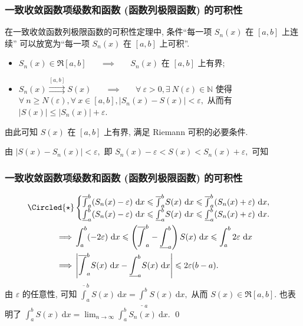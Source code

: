 
\begin{frame}
\frametitle{一致收敛函数项级数和函数 (函数列极限函数) 的可积性}

\begin{remark}
在一致收敛函数列极限函数的可积性定理中, 条件``每一项 $S_n(x)$ 在 $[a, b]$ 上连续'' 可以放宽为``每一项 $S_n(x)$ 在 $[a, b]$ 上可积''.
\end{remark}

\startproof[bg=yellow, fg=red]
\begin{itemize}
\item $S_n(x) \in \mathfrak{R}[a, b]$ ~~ $\implies$ ~~ $S_n(x)$ 在 $[a, b]$ 上有界;
\item $S_n(x) \stackrel{[a, b]}{\rightrightarrows} S(x)$ ~~ $\implies$ ~~ $\forall ~ \varepsilon > 0, \exists ~ N(\varepsilon) \in \mathbb{N}$ 使得 $\forall ~ n \geqslant N(\varepsilon), \forall ~ x \in [a, b], |S_n(x) - S(x)| < \varepsilon,$ 从而有 $|S(x)| \leqslant |S_n(x)| + \varepsilon.$
\end{itemize}
\vspace{0.5em}
由此可知 $S(x)$ 在 $[a, b]$ 上有界, 满足 Riemann 可积的必要条件.

\pause
\vspace{0.8em}

由 $\left| S(x) - S_n(x) \right| < \varepsilon,$ 即 $S_n(x) - \varepsilon < S(x) < S_n(x) + \varepsilon,$ 可知

\end{frame}


\begin{frame}
\frametitle{一致收敛函数项级数和函数 (函数列极限函数) 的可积性}

\begin{align*}
\Circled{\star} & \begin{cases} \overline{\int}_a^b (S_n(x) - \varepsilon) ~ \mathrm{d}x \leqslant \overline{\int}_a^b S(x) ~ \mathrm{d}x \leqslant \overline{\int}_a^b (S_n(x) + \varepsilon) ~ \mathrm{d}x, \\ \underline{\int}_a^b (S_n(x) - \varepsilon) ~ \mathrm{d}x \leqslant \underline{\int}_a^b S(x) ~ \mathrm{d}x \leqslant \underline{\int}_a^b (S_n(x) + \varepsilon) ~ \mathrm{d}x. \end{cases} \\
\implies & \int_a^b (-2\varepsilon) ~ \mathrm{d}x \leqslant \left( \overline{\int}_a^b - \underline{\int}_a^b \right) S(x) ~ \mathrm{d}x \leqslant \int_a^b 2\varepsilon ~ \mathrm{d}x \\
\implies & \left| \overline{\int}_a^b S(x) ~ \mathrm{d}x - \underline{\int}_a^b S(x) ~ \mathrm{d}x \right| \leqslant 2\varepsilon (b - a).
\end{align*}
由 $\varepsilon$ 的任意性, 可知 $\overline{\int}_a^b S(x) ~ \mathrm{d}x = \underline{\int}_a^b S(x) ~ \mathrm{d}x,$ 从而 $S(x) \in \mathfrak{R}[a, b].$
\pause
\Circled{$\star$} 也表明了 $\int_a^b S(x) ~ \mathrm{d}x = \lim_{n\to\infty} \int_a^b S_n(x) ~ \mathrm{d}x.$
\qed

\end{frame}

